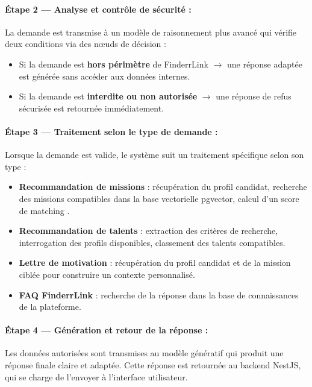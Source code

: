 \paragraph{Étape 2 — Analyse et contrôle de sécurité :}
La demande est transmise à un modèle de raisonnement plus avancé qui vérifie deux conditions via des nœuds de décision :
\begin{itemize}
    \item Si la demande est \textbf{hors périmètre} de FinderrLink $\rightarrow$ une réponse adaptée est générée sans accéder aux données internes.
    \item Si la demande est \textbf{interdite ou non autorisée} $\rightarrow$ une réponse de refus sécurisée est retournée immédiatement.
\end{itemize}

\paragraph{Étape 3 — Traitement selon le type de demande :}
Lorsque la demande est valide, le système suit un traitement spécifique selon son type :
\begin{itemize}
    \item \textbf{Recommandation de missions} : récupération du profil candidat, recherche des missions compatibles dans la base vectorielle pgvector, calcul d'un score de matching \cite{pgvector}.
    \item \textbf{Recommandation de talents} : extraction des critères de recherche, interrogation des profils disponibles, classement des talents compatibles.
    \item \textbf{Lettre de motivation} : récupération du profil candidat et de la mission ciblée pour construire un contexte personnalisé.
    \item \textbf{FAQ FinderrLink} : recherche de la réponse dans la base de connaissances de la plateforme.
\end{itemize}

\paragraph{Étape 4 — Génération et retour de la réponse :}
Les données autorisées sont transmises au modèle génératif qui produit une réponse finale claire et adaptée. Cette réponse est retournée au backend NestJS, qui se charge de l'envoyer à l'interface utilisateur.



